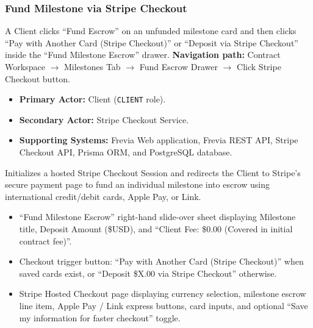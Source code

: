 \subsubsection{ Fund Milestone via Stripe Checkout}

A Client clicks ``Fund Escrow'' on an unfunded milestone card and then clicks ``Pay with Another Card (Stripe Checkout)'' or ``Deposit via Stripe Checkout'' inside the ``Fund Milestone Escrow'' drawer.\newline
\textbf{Navigation path:} Contract Workspace $\rightarrow$ Milestones Tab $\rightarrow$ Fund Escrow Drawer $\rightarrow$ Click Stripe Checkout button.


\begin{itemize}[leftmargin=1.6em,topsep=3pt,itemsep=2pt,parsep=0pt,label=$\bullet$]
      \item \textbf{Primary Actor:} Client (\texttt{CLIENT} role).
      \item \textbf{Secondary Actor:} Stripe Checkout Service.
      \item \textbf{Supporting Systems:} Frevia Web application, Frevia REST API, Stripe Checkout API, Prisma ORM, and PostgreSQL database.
\end{itemize}

\noindent Initializes a hosted Stripe Checkout Session and redirects the Client to Stripe's secure payment page to fund an individual milestone into escrow using international credit/debit cards, Apple Pay, or Link.

\begin{itemize}[leftmargin=1.6em,topsep=3pt,itemsep=2pt,parsep=0pt,label=$\bullet$]
      \item ``Fund Milestone Escrow'' right-hand slide-over sheet displaying Milestone title, Deposit Amount (\$USD), and ``Client Fee: \$0.00 (Covered in initial contract fee)''.
      \item Checkout trigger button: ``Pay with Another Card (Stripe Checkout)'' when saved cards exist, or ``Deposit \$X.00 via Stripe Checkout'' otherwise.
      \item Stripe Hosted Checkout page displaying currency selection, milestone escrow line item, Apple Pay / Link express buttons, card inputs, and optional ``Save my information for faster checkout'' toggle.
\end{itemize}

